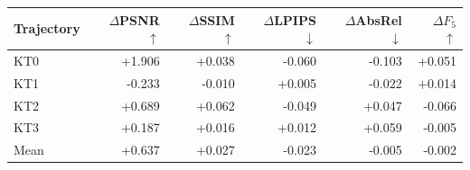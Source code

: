 \begin{tabular}{lrrrrr}
\toprule
Trajectory & $\Delta$PSNR $\uparrow$ & $\Delta$SSIM $\uparrow$ & $\Delta$LPIPS $\downarrow$ & $\Delta$AbsRel $\downarrow$ & $\Delta F_{5}$ $\uparrow$ \\
\midrule
KT0 & +1.906 & +0.038 & -0.060 & -0.103 & +0.051 \\
KT1 & -0.233 & -0.010 & +0.005 & -0.022 & +0.014 \\
KT2 & +0.689 & +0.062 & -0.049 & +0.047 & -0.066 \\
KT3 & +0.187 & +0.016 & +0.012 & +0.059 & -0.005 \\
\midrule
Mean & +0.637 & +0.027 & -0.023 & -0.005 & -0.002 \\
\bottomrule
\end{tabular}
